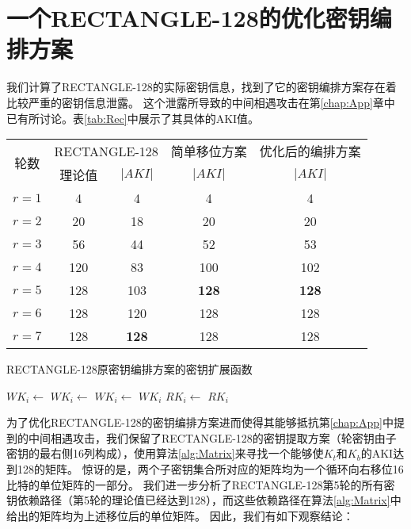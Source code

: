 \section{一个RECTANGLE-128的优化密钥编排方案}
我们计算了RECTANGLE-128的实际密钥信息，找到了它的密钥编排方案存在着比较严重的密钥信息泄露。
这个泄露所导致的中间相遇攻击在第\ref{chap:App}章中已有所讨论。表\ref{tab:Rec}中展示了其具体的AKI值。
\begin{table}[htbp]
    \centering
    \begin{tabular}{c|c|c|c|c}
        \multirow{2}{*}{轮数} & \multicolumn{2}{c|}{RECTANGLE-128} & 简单移位方案 & 优化后的编排方案\\
        \cline{2-5}
        & 理论值 & $|AKI|$ & $|AKI|$ &$ |AKI| $\\
        \hline
        $r=1$ & 4 & 4 & 4 & 4\\
        $r=2$ & 20 & 18 & 20 & 20\\
        $r=3$ & 56 & 44 & 52 & 53\\ 
        $r=4$ & 120 & 83 & 100 & 102\\ 
        $r=5$ & 128 & 103 & \textbf{128} &\textbf{128}\\ 
        $r=6$ & 128 & 120 & 128 & 128\\ 
        $r=7$ & 128 & \textbf{128} & 128& 128\\ 
        \hline
    \end{tabular}
\end{table}
\begin{algorithm}
    \caption{RECTANGLE-128原密钥编排方案的密钥扩展函数}
    \begin{algorithmic}[1]
        \State $WK_i \gets$ 
        \State $WK_i \gets$ 
        \State $WK_i \gets$ 
        \State \Return $WK_i$
        \EndFunction
        \State $RK_i \gets$ 
        \State \Return $RK_i$
        \EndFunction
    \end{algorithmic}
    \label{alg:key}
\end{algorithm}

为了优化RECTANGLE-128的密钥编排方案进而使得其能够抵抗第\ref{chap:App}中提到的中间相遇攻击，我们保留了RECTANGLE-128的密钥提取方案（轮密钥由子密钥的最右侧16列构成），使用算法\ref{alg:Matrix}来寻找一个能够使$K_t$和$K_b$的AKI达到128的矩阵。
惊讶的是，两个子密钥集合所对应的矩阵均为一个循环向右移位16比特的单位矩阵的一部分。
我们进一步分析了RECTANGLE-128第5轮的所有密钥依赖路径（第5轮的理论值已经达到128），而这些依赖路径在算法\ref{alg:Matrix}中给出的矩阵均为上述移位后的单位矩阵。
因此，我们有如下观察结论：

